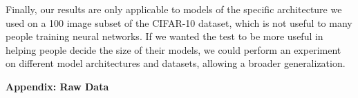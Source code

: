 \documentclass[12pt]{article}
\begin{document}
    \bigskip\noindent Finally, our results are only applicable to models of the specific architecture we used on a 100 image subset of the CIFAR-10 dataset, which is not useful to many people training neural networks.
    If we wanted the test to be more useful in helping people decide the size of their models, we could perform an experiment on different model architectures and datasets, allowing a broader generalization.



    \clearpage
    \appendix
    \textbf{Appendix: Raw Data}

    \begingroup
    \scriptsize
    \setlength{\tabcolsep}{2pt}       %
\end{document}
